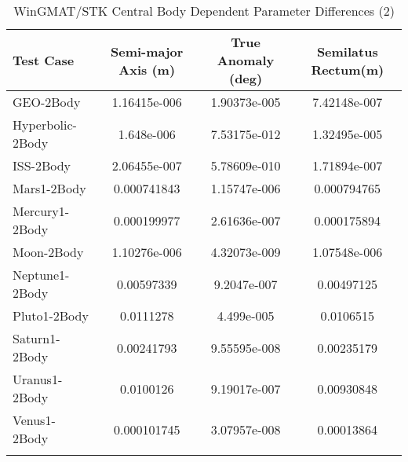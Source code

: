 \begin{table}[htbp!]
\centering
\caption{ WinGMAT/STK Central Body Dependent Parameter Differences (2)}
      \begin{tabular}{lccc}
      \hline\hline
          Test Case & Semi-major Axis (m) & True Anomaly (deg) & Semilatus Rectum(m) \\
         \hline
         GEO-2Body & 1.16415e-006 & 1.90373e-005 & 7.42148e-007 \\
         Hyperbolic-2Body & 1.648e-006 & 7.53175e-012 & 1.32495e-005 \\
         ISS-2Body & 2.06455e-007 & 5.78609e-010 & 1.71894e-007 \\
         Mars1-2Body & 0.000741843 & 1.15747e-006 & 0.000794765 \\
         Mercury1-2Body & 0.000199977 & 2.61636e-007 & 0.000175894 \\
         Moon-2Body & 1.10276e-006 & 4.32073e-009 & 1.07548e-006 \\
         Neptune1-2Body & 0.00597339 & 9.2047e-007 & 0.00497125 \\
         Pluto1-2Body & 0.0111278 & 4.499e-005 & 0.0106515 \\
         Saturn1-2Body & 0.00241793 & 9.55595e-008 & 0.00235179 \\
         Uranus1-2Body & 0.0100126 & 9.19017e-007 & 0.00930848 \\
         Venus1-2Body & 0.000101745 & 3.07957e-008 & 0.00013864 \\
      \hline\hline
      \label{Table: WinGMAT-STK CB Parameters Set 2} 
\end{tabular}
\end{table}
